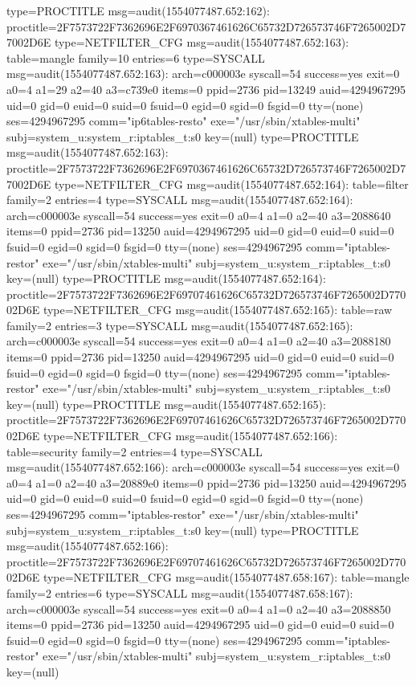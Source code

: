 \documentclass[]{report}
\newenvironment{Shaded}{}{}
\newcommand{\NormalTok}[1]{#1}
\begin{document}
\begin{Shaded}
\begin{Highlighting}[]
\NormalTok{type=PROCTITLE msg=audit(1554077487.652:162): proctitle=2F7573722F7362696E2F6970367461626C65732D726573746F7265002D77002D6E}
\NormalTok{type=NETFILTER_CFG msg=audit(1554077487.652:163): table=mangle family=10 entries=6}
\NormalTok{type=SYSCALL msg=audit(1554077487.652:163): arch=c000003e syscall=54 success=yes exit=0 a0=4 a1=29 a2=40 a3=c739e0 items=0 ppid=2736 pid=13249 auid=4294967295 uid=0 gid=0 euid=0 suid=0 fsuid=0 egid=0 sgid=0 fsgid=0 tty=(none) ses=4294967295 comm="ip6tables-resto" exe="/usr/sbin/xtables-multi" subj=system_u:system_r:iptables_t:s0 key=(null)}
\NormalTok{type=PROCTITLE msg=audit(1554077487.652:163): proctitle=2F7573722F7362696E2F6970367461626C65732D726573746F7265002D77002D6E}
\NormalTok{type=NETFILTER_CFG msg=audit(1554077487.652:164): table=filter family=2 entries=4}
\NormalTok{type=SYSCALL msg=audit(1554077487.652:164): arch=c000003e syscall=54 success=yes exit=0 a0=4 a1=0 a2=40 a3=2088640 items=0 ppid=2736 pid=13250 auid=4294967295 uid=0 gid=0 euid=0 suid=0 fsuid=0 egid=0 sgid=0 fsgid=0 tty=(none) ses=4294967295 comm="iptables-restor" exe="/usr/sbin/xtables-multi" subj=system_u:system_r:iptables_t:s0 key=(null)}
\NormalTok{type=PROCTITLE msg=audit(1554077487.652:164): proctitle=2F7573722F7362696E2F69707461626C65732D726573746F7265002D77002D6E}
\NormalTok{type=NETFILTER_CFG msg=audit(1554077487.652:165): table=raw family=2 entries=3}
\NormalTok{type=SYSCALL msg=audit(1554077487.652:165): arch=c000003e syscall=54 success=yes exit=0 a0=4 a1=0 a2=40 a3=2088180 items=0 ppid=2736 pid=13250 auid=4294967295 uid=0 gid=0 euid=0 suid=0 fsuid=0 egid=0 sgid=0 fsgid=0 tty=(none) ses=4294967295 comm="iptables-restor" exe="/usr/sbin/xtables-multi" subj=system_u:system_r:iptables_t:s0 key=(null)}
\NormalTok{type=PROCTITLE msg=audit(1554077487.652:165): proctitle=2F7573722F7362696E2F69707461626C65732D726573746F7265002D77002D6E}
\NormalTok{type=NETFILTER_CFG msg=audit(1554077487.652:166): table=security family=2 entries=4}
\NormalTok{type=SYSCALL msg=audit(1554077487.652:166): arch=c000003e syscall=54 success=yes exit=0 a0=4 a1=0 a2=40 a3=20889e0 items=0 ppid=2736 pid=13250 auid=4294967295 uid=0 gid=0 euid=0 suid=0 fsuid=0 egid=0 sgid=0 fsgid=0 tty=(none) ses=4294967295 comm="iptables-restor" exe="/usr/sbin/xtables-multi" subj=system_u:system_r:iptables_t:s0 key=(null)}
\NormalTok{type=PROCTITLE msg=audit(1554077487.652:166): proctitle=2F7573722F7362696E2F69707461626C65732D726573746F7265002D77002D6E}
\NormalTok{type=NETFILTER_CFG msg=audit(1554077487.658:167): table=mangle family=2 entries=6}
\NormalTok{type=SYSCALL msg=audit(1554077487.658:167): arch=c000003e syscall=54 success=yes exit=0 a0=4 a1=0 a2=40 a3=2088850 items=0 ppid=2736 pid=13250 auid=4294967295 uid=0 gid=0 euid=0 suid=0 fsuid=0 egid=0 sgid=0 fsgid=0 tty=(none) ses=4294967295 comm="iptables-restor" exe="/usr/sbin/xtables-multi" subj=system_u:system_r:iptables_t:s0 key=(null)}

\end{Highlighting}
\end{Shaded}
\end{document}
